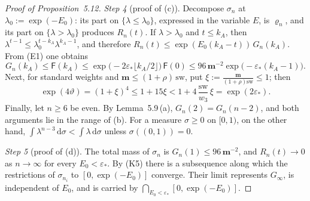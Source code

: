 \documentclass[11pt]{amsart}
\theoremstyle{definition}
\begin{document}
\begin{proof}[Proof of Proposition~5.12]
\emph{Step 4} (proof of (c)).
Decompose $\sigma_n$ at $\lambda_0:=\exp(-E_0)$: its part on $\{\lambda\le\lambda_0\}$, expressed in the variable $E$, is $\varrho_n$, and its part on $\{\lambda>\lambda_0\}$ produces $R_n(t)$.
If $\lambda>\lambda_0$ and $t\le k_A$, then $\lambda^{t-1}\le\lambda_0^{t-k_A}\lambda^{k_A-1}$, and therefore $R_n(t)\le\exp(E_0(k_A-t))\,G_n(k_A)$.
From (E1) one obtains
\begin{equation*}
G_n(k_A)\le\mathsf F(k_A)\le\exp\bigl(-2\varepsilon_*\lfloor k_A/2\rfloor\bigr)\,\mathsf F(0)\le96\,\mathbf m^{-2}\exp\bigl(-\varepsilon_*(k_A-1)\bigr).
\end{equation*}
Next, for standard weights and $\mathbf m\le(1+\rho)\,\mathrm{sw}$, put $\xi:=\frac{\mathbf m}{(1+\rho)\mathrm{sw}}\le1$; then
\begin{equation*}
\exp(4\vartheta)=(1+\xi)^4\le1+15\xi<1+4\,\frac{\mathrm{sw}}{w_3}\,\xi=\exp(2\varepsilon_*).
\end{equation*}
Finally, let $n\ge6$ be even.
By Lemma~5.9\,(a), $G_n(2)=G_n(n-2)$, and both arguments lie in the range of (b).
For a measure $\sigma\ge0$ on $[0,1)$, on the other hand, $\int\lambda^{n-3}\,\mathrm d\sigma<\int\lambda\,\mathrm d\sigma$ unless $\sigma((0,1))=0$.

\emph{Step 5} (proof of (d)).
The total mass of $\sigma_n$ is $G_n(1)\le96\,\mathbf m^{-2}$, and $R_n(t)\to0$ as $n\to\infty$ for every $E_0<\varepsilon_*$.
By (K5) there is a subsequence along which the restrictions of $\sigma_{n_i}$ to $[0,\exp(-E_0)]$ converge.
Their limit represents $G_\infty$, is independent of $E_0$, and is carried by $\bigcap_{E_0<\varepsilon_*}[0,\exp(-E_0)]$.
\end{proof}
\end{document}
